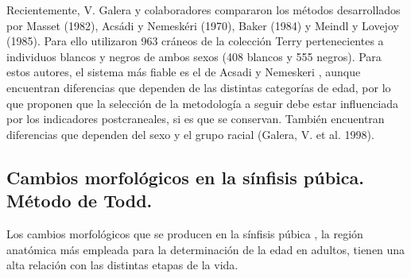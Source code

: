 \documentclass[a4paper,11pt]{article}
\begin{document}
\begin{center}
\end{center}

Recientemente, V. Galera y colaboradores compararon los métodos desarrollados por Masset (1982), Acsádi y Nemeskéri (1970), Baker (1984) y Meindl y Lovejoy (1985). Para ello utilizaron 963 cráneos de la colección Terry pertenecientes a individuos blancos y negros de ambos sexos (408 blancos y 555 negros).
Para estos autores, el sistema más fiable es el de Acsadi y Nemeskeri , aunque encuentran diferencias que dependen de las distintas categorías de edad, por lo que proponen que la selección de la metodología a seguir debe estar influenciada por los indicadores postcraneales, si es que se conservan. También encuentran diferencias que dependen del sexo y el grupo racial (Galera, V. et al. 1998).
\subsection{Cambios morfológicos en la sínfisis púbica. Método de Todd.}
Los cambios morfológicos que se producen en la sínfisis púbica , la región anatómica más empleada para la determinación de la edad en adultos, tienen una alta relación con las distintas etapas de la vida.
\end{document}
